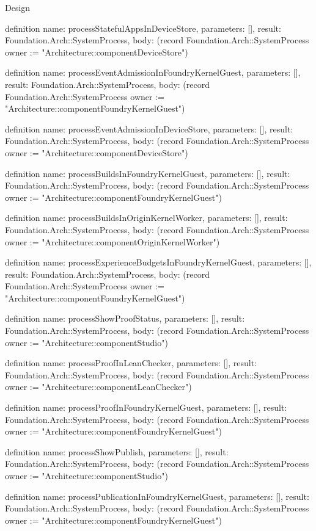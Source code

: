 \begin{lexlean}{Design}
\begin{semanticmodule}
definition{
  name: processStatefulAppsInDeviceStore,
  parameters: [],
  result: Foundation.Arch::SystemProcess,
  body: (record Foundation.Arch::SystemProcess {owner := "Architecture::componentDeviceStore"})
}

definition{
  name: processEventAdmissionInFoundryKernelGuest,
  parameters: [],
  result: Foundation.Arch::SystemProcess,
  body: (record Foundation.Arch::SystemProcess {owner := "Architecture::componentFoundryKernelGuest"})
}

definition{
  name: processEventAdmissionInDeviceStore,
  parameters: [],
  result: Foundation.Arch::SystemProcess,
  body: (record Foundation.Arch::SystemProcess {owner := "Architecture::componentDeviceStore"})
}

definition{
  name: processBuildsInFoundryKernelGuest,
  parameters: [],
  result: Foundation.Arch::SystemProcess,
  body: (record Foundation.Arch::SystemProcess {owner := "Architecture::componentFoundryKernelGuest"})
}

definition{
  name: processBuildsInOriginKernelWorker,
  parameters: [],
  result: Foundation.Arch::SystemProcess,
  body: (record Foundation.Arch::SystemProcess {owner := "Architecture::componentOriginKernelWorker"})
}

definition{
  name: processExperienceBudgetsInFoundryKernelGuest,
  parameters: [],
  result: Foundation.Arch::SystemProcess,
  body: (record Foundation.Arch::SystemProcess {owner := "Architecture::componentFoundryKernelGuest"})
}

definition{
  name: processShowProofStatus,
  parameters: [],
  result: Foundation.Arch::SystemProcess,
  body: (record Foundation.Arch::SystemProcess {owner := "Architecture::componentStudio"})
}

definition{
  name: processProofInLeanChecker,
  parameters: [],
  result: Foundation.Arch::SystemProcess,
  body: (record Foundation.Arch::SystemProcess {owner := "Architecture::componentLeanChecker"})
}

definition{
  name: processProofInFoundryKernelGuest,
  parameters: [],
  result: Foundation.Arch::SystemProcess,
  body: (record Foundation.Arch::SystemProcess {owner := "Architecture::componentFoundryKernelGuest"})
}

definition{
  name: processShowPublish,
  parameters: [],
  result: Foundation.Arch::SystemProcess,
  body: (record Foundation.Arch::SystemProcess {owner := "Architecture::componentStudio"})
}

definition{
  name: processPublicationInFoundryKernelGuest,
  parameters: [],
  result: Foundation.Arch::SystemProcess,
  body: (record Foundation.Arch::SystemProcess {owner := "Architecture::componentFoundryKernelGuest"})
}


\end{semanticmodule}
\end{lexlean}
